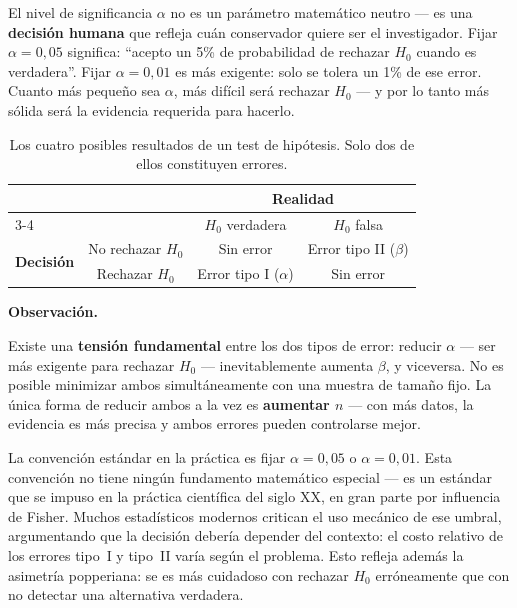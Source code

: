 \documentclass[12pt, a4paper]{book}
\newenvironment{observacion}{%
    \par\medskip\noindent\textbf{\color{azul}Observaci\'{o}n.}\enspace\itshape
}{\par\medskip}
\numberwithin{equation}{chapter}
\begin{document}
El nivel de significancia $\alpha$ no es un
par\'{a}metro matem\'{a}tico neutro --- es una
\textbf{decisi\'{o}n humana} que refleja cu\'{a}n
conservador quiere ser el investigador. Fijar
$\alpha = 0{,}05$ significa: ``acepto un 5\% de
probabilidad de rechazar $H_0$ cuando es verdadera''.
Fijar $\alpha = 0{,}01$ es m\'{a}s exigente: solo
se tolera un 1\% de ese error. Cuanto m\'{a}s
peque\~{n}o sea $\alpha$, m\'{a}s dif\'{i}cil
ser\'{a} rechazar $H_0$ --- y por lo tanto
m\'{a}s s\'{o}lida ser\'{a} la evidencia requerida
para hacerlo.

\begin{table}[H]
	\centering
	\begin{tabular}{lccc}
		\toprule
		& & \multicolumn{2}{c}{\textbf{Realidad}} \\
		\cmidrule(lr){3-4}
		& & $H_0$ verdadera & $H_0$ falsa \\
		\midrule
		\multirow{2}{*}{\textbf{Decisi\'{o}n}} &
		No rechazar $H_0$ &
		\cellcolor{verde!20} Sin error &
		\cellcolor{rojo!20} Error tipo II ($\beta$) \\[6pt]
		& Rechazar $H_0$ &
		\cellcolor{rojo!20} Error tipo I ($\alpha$) &
		\cellcolor{verde!20} Sin error \\
		\bottomrule
	\end{tabular}
	\caption{Los cuatro posibles resultados de un test de
		hip\'{o}tesis. Solo dos de ellos constituyen errores.}
	\label{tab:errores}
\end{table}

\begin{observacion}
	Existe una \textbf{tensi\'{o}n fundamental} entre
	los dos tipos de error: reducir $\alpha$ ---
	ser m\'{a}s exigente para rechazar $H_0$ ---
	inevitablemente aumenta $\beta$, y viceversa.
	No es posible minimizar ambos simult\'{a}neamente
	con una muestra de tama\~{n}o fijo. La \'{u}nica
	forma de reducir ambos a la vez es \textbf{aumentar
		$n$} --- con m\'{a}s datos, la evidencia es m\'{a}s
	precisa y ambos errores pueden controlarse mejor.
	
	La convenci\'{o}n est\'{a}ndar en la pr\'{a}ctica
	es fijar $\alpha = 0{,}05$ o $\alpha = 0{,}01$.
	Esta convenci\'{o}n no tiene ning\'{u}n fundamento
	matem\'{a}tico especial --- es un est\'{a}ndar que
	se impuso en la pr\'{a}ctica cient\'{i}fica del
	siglo XX, en gran parte por influencia de Fisher.
	Muchos estad\'{i}sticos modernos critican el uso
	mec\'{a}nico de ese umbral, argumentando que la
	decisi\'{o}n deber\'{i}a depender del contexto:
	el costo relativo de los errores tipo~I y tipo~II
	var\'{i}a seg\'{u}n el problema. Esto refleja
	adem\'{a}s la asimetr\'{i}a popperiana: se es
	m\'{a}s cuidadoso con rechazar $H_0$
	err\'{o}neamente que con no detectar una
	alternativa verdadera.
\end{observacion}
\end{document}
